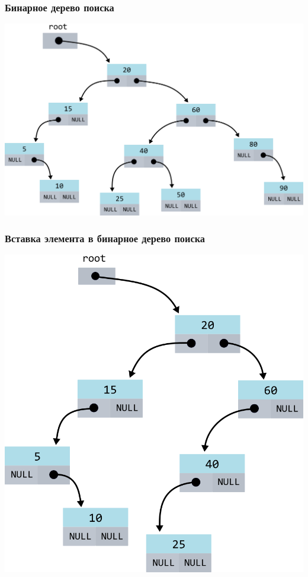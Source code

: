 \documentclass[10pt,pdf,hyperref={unicode}]{beamer}
\begin{document}
\begin{frame}[fragile]
\frametitle{Бинарное дерево поиска}
\begin{center}
\includegraphics[scale=0.6]{images/tree/bst.png}
\end{center}
\end{frame}


\begin{frame}[fragile]
\frametitle{Вставка элемента в бинарное дерево поиска}
\begin{center}
\includegraphics[scale=0.8]{images/tree/codetree/codetree0.png}
\end{center}
\end{frame}
\end{document}
